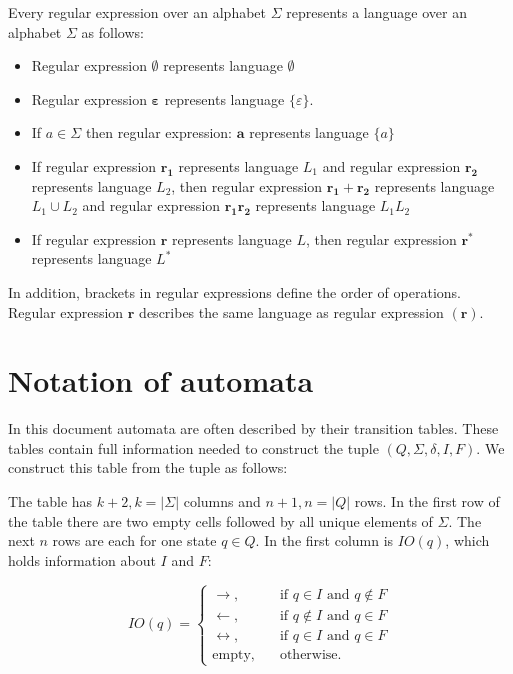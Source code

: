 \documentclass{ctuthesis}
\begin{document}
Every regular expression over an alphabet $\Sigma$ represents a language over an alphabet $\Sigma$ as follows: 
\begin{itemize}
	\item Regular expression $\boldsymbol{\emptyset}$ represents language $\emptyset$
	\item Regular expression $\boldsymbol{\varepsilon}$ represents language $\{\varepsilon\}$.
	\item If $a \in \Sigma$ then regular expression: $\mathbf{a}$ represents language $\{a\}$
	\item If regular expression $\mathbf{r_1}$ represents language $L_1$ and regular expression $\mathbf{r_2}$ represents language $L_2$, then regular expression $\mathbf{r_1 + r_2}$ represents language $L_1 \cup L_2$ and regular expression $\mathbf{r_1r_2}$ represents language $L_1L_2$
	\item If regular expression $\mathbf{r}$ represents language $L$, then regular expression $\mathbf{r^*}$ represents language $L^*$
\end{itemize}

In addition, brackets in regular expressions define the order of operations. Regular expression $\mathbf{r}$ describes the same language as regular expression $\mathbf{(r)}$. 

\section{Notation of automata}
In this document automata are often described by their transition tables. These tables contain full information needed to construct the tuple $(Q, \Sigma, \delta, I, F)$. We construct this table from the tuple as follows:

The table has $k+2, k = |\Sigma|$ columns and $n+1, n = |Q|$ rows. In the first row of the table there are two empty cells followed by all unique elements of $\Sigma$. The next $n$ rows are each for one state $q \in Q$. In the first column is $IO(q)$, which holds information about $I$ and $F$:

\begin{equation*}
	IO(q) = 
	\begin{cases}
		\rightarrow, & \quad \text{if } q \in I \text{ and } q \not \in F \\
		\leftarrow, & \quad \text{if } q \not \in I \text{ and } q \in F \\
		\leftrightarrow, & \quad \text{if } q \in I \text{ and } q \in F \\
		\text{empty}, & \quad \text{otherwise.}  
	\end{cases}
\end{equation*}
\end{document}
